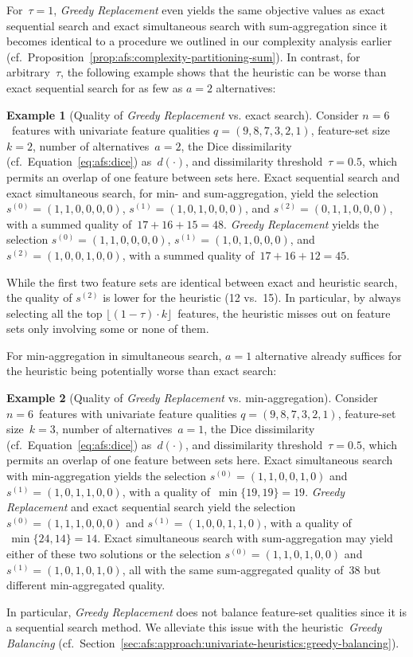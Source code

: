 \documentclass{article}
\theoremstyle{definition}
\newtheorem{example}{Example}
\begin{document}
%
For~$\tau = 1$, \emph{Greedy Replacement} even yields the same objective values as exact sequential search and exact simultaneous search with sum-aggregation since it becomes identical to a procedure we outlined in our complexity analysis earlier (cf.~Proposition~\ref{prop:afs:complexity-partitioning-sum}).
In contrast, for arbitrary~$\tau$, the following example shows that the heuristic can be worse than exact sequential search for as few as $a=2$ alternatives:
%
\begin{example}[Quality of \emph{Greedy Replacement} vs. exact search]
	Consider $n=6$~features with univariate feature qualities $q = (9,8,7,3,2,1)$, feature-set size~$k=2$, number of alternatives~$a=2$, the Dice dissimilarity (cf.~Equation~\ref{eq:afs:dice}) as~$d(\cdot)$, and dissimilarity threshold~$\tau = 0.5$, which permits an overlap of one feature between sets here.
	Exact sequential search and exact simultaneous search, for min- and sum-aggregation, yield the selection $s^{(0)} = (1,1,0,0,0,0)$, $s^{(1)} = (1,0,1,0,0,0)$, and $s^{(2)} = (0,1,1,0,0,0)$, with a summed quality of $\,17+16+15=48$.
	\emph{Greedy Replacement} yields the selection $s^{(0)} = (1,1,0,0,0,0)$, $s^{(1)} = (1,0,1,0,0,0)$, and $s^{(2)} = (1,0,0,1,0,0)$, with a summed quality of $\,17+16+12=45$.
	\label{ex:afs:greedy-replacement:worse-than-exact}
\end{example}
%
While the first two feature sets are identical between exact and heuristic search, the quality of $s^{(2)}$ is lower for the heuristic (12 vs.~15).
In particular, by always selecting all the top $\lfloor (1 - \tau) \cdot k \rfloor$~features, the heuristic misses out on feature sets only involving some or none of them.

For min-aggregation in simultaneous search, $a=1$ alternative already suffices for the heuristic being potentially worse than exact search:
%
\begin{example}[Quality of \emph{Greedy Replacement} vs. min-aggregation]
	Consider $n=6$~features with univariate feature qualities $q = (9,8,7,3,2,1)$, feature-set size~$k=3$, number of alternatives~$a=1$, the Dice dissimilarity (cf.~Equation~\ref{eq:afs:dice}) as~$d(\cdot)$, and dissimilarity threshold~$\tau = 0.5$, which permits an overlap of one feature between sets here.
	Exact simultaneous search with min-aggregation yields the selection $s^{(0)} = (1,1,0,0,1,0)$ and $s^{(1)} = (1,0,1,1,0,0)$, with a quality of $\,\min \{19,19\} = 19$.
	\emph{Greedy Replacement} and exact sequential search yield the selection $s^{(0)} = (1,1,1,0,0,0)$ and $s^{(1)} = (1,0,0,1,1,0)$, with a quality of $\,\min \{24,14\} = 14$.
	Exact simultaneous search with sum-aggregation may yield either of these two solutions or the selection $s^{(0)} = (1,1,0,1,0,0)$ and $s^{(1)} = (1,0,1,0,1,0)$, all with the same sum-aggregated quality of~38 but different min-aggregated quality.
	\label{ex:afs:greedy-replacement:worse-than-min-agg}
\end{example}
%
In particular, \emph{Greedy Replacement} does not balance feature-set qualities since it is a sequential search method.
We alleviate this issue with the heuristic~\emph{Greedy Balancing} (cf.~Section~\ref{sec:afs:approach:univariate-heuristics:greedy-balancing}).
\end{document}
